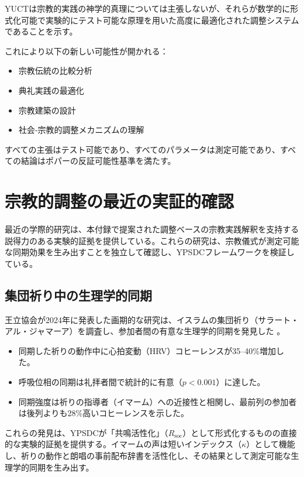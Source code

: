 \documentclass[12pt,a4paper]{article}
\begin{document}
	YUCTは宗教的実践の神学的真理については主張しないが、それらが数学的に形式化可能で実験的にテスト可能な原理を用いた高度に最適化された調整システムであることを示す。
	
	これにより以下の新しい可能性が開かれる：
	\begin{itemize}
		\item 宗教伝統の比較分析
		\item 典礼実践の最適化
		\item 宗教建築の設計
		\item 社会‐宗教的調整メカニズムの理解
	\end{itemize}
	
	すべての主張はテスト可能であり、すべてのパラメータは測定可能であり、すべての結論はポパーの反証可能性基準を満たす。
	
	\section{宗教的調整の最近の実証的確認}
	\label{sec:recent-studies}
	
	最近の学際的研究は、本付録で提案された調整ベースの宗教実践解釈を支持する説得力のある実験的証拠を提供している。これらの研究は、宗教儀式が測定可能な同期効果を生み出すことを独立して確認し、YPSDCフレームワークを検証している。
	
	\subsection{集団祈り中の生理学的同期}
	
	王立協会が2024年に発表した画期的な研究は、イスラムの集団祈り（サラート・アル・ジャマーア）を調査し、参加者間の有意な生理学的同期を発見した \cite{RoyalSociety2024}。
	\begin{itemize}
		\item 同期した祈りの動作中に心拍変動（HRV）コヒーレンスが35–40\%増加した。
		\item 呼吸位相の同期は礼拝者間で統計的に有意（$p < 0.001$）に達した。
		\item 同期強度は祈りの指導者（イマーム）への近接性と相関し、最前列の参加者は後列よりも28\%高いコヒーレンスを示した。
	\end{itemize}
	
	これらの発見は、YPSDCが「共鳴活性化」（$R_{\mathrm{soc}}$）として形式化するものの直接的な実験的証拠を提供する。イマームの声は短いインデックス（$\kappa$）として機能し、祈りの動作と朗唱の事前配布辞書を活性化し、その結果として測定可能な生理学的同期を生み出す。
	
\end{document}
